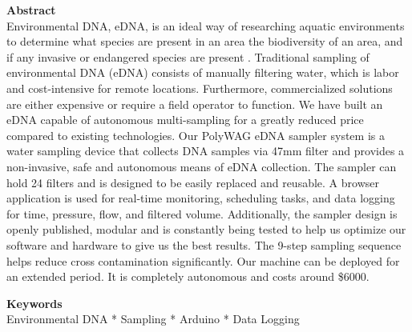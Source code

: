 \documentclass[11pt, letterpaper]{article}
\begin{document}
\begin{flushleft}
\textbf{Abstract} \\ 
Environmental DNA, eDNA, is an ideal way of researching aquatic environments to determine what species are present in an area the biodiversity of an area, and if any invasive or endangered species are present . Traditional sampling of environmental DNA (eDNA) consists of manually filtering water,  which is labor and cost-intensive for remote locations. Furthermore, commercialized solutions  are either expensive or require a field operator to function.  We have built an eDNA capable of autonomous multi-sampling for a greatly reduced price compared to existing technologies. Our PolyWAG eDNA sampler system is a water sampling device that collects DNA samples via 47mm filter and provides a non-invasive, safe and autonomous means of eDNA collection. The sampler can hold 24 filters and is designed to be easily replaced and reusable. A browser application is used for real-time monitoring, scheduling tasks, and data logging for time, pressure, flow, and filtered volume. Additionally, the sampler design is openly published, modular and is constantly being tested to help us optimize our software and hardware to give us the best results. The 9-step  sampling sequence helps reduce cross contamination significantly. Our machine can be deployed for an extended period. It is completely autonomous and costs around \$6000.



\textbf{Keywords}\\
Environmental DNA * Sampling * Arduino * Data Logging \\


\end{flushleft}
\end{document}
